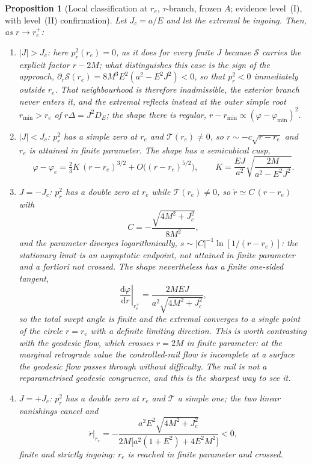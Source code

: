 \documentclass[12pt]{iopart}
\theoremstyle{plain}
\newtheorem{proposition}{Proposition}
\theoremstyle{definition}
\theoremstyle{remark}
\newcommand{\re}{r_{e}}
\newcommand{\Jc}{J_{c}}
\newcommand{\dd}{\mathrm{d}}
\begin{document}
\begin{proposition}[Local classification at $\re$, $\tau$-branch, frozen $A$;
evidence level~(I), with level~(II) confirmation]
\label{prop:classification}
Let $\Jc=a/E$ and let the extremal be ingoing. Then, as $r\to\re^+$:
\begin{enumerate}
\item[\rm(i)] $|J|>\Jc$: here $p_r^2(\re)=0$, as it does for every finite $J$
because $\mathcal S$ carries the explicit factor $r-2M$; what distinguishes this
case is the sign of the approach, $\partial_r\mathcal S(\re)=8M^3E^2(a^2-E^2J^2)<0$,
so that $p_r^2<0$ immediately outside $\re$. That neighbourhood is therefore
inadmissible, the exterior branch never enters it, and the extremal reflects
instead at the outer simple root $r_{\min}>\re$ of $r\Delta=J^2D_E$; the shape
there is regular, $r-r_{\min}\propto(\varphi-\varphi_{\min})^2$.
\item[\rm(ii)] $|J|<\Jc$: $p_r^2$ has a \emph{simple} zero at $\re$ and
$\mathcal T(\re)\neq0$, so $\dot r\sim-c\sqrt{r-\re}$ and $\re$ is attained in
\emph{finite} parameter. The shape has a semicubical cusp,
\begin{equation}
    \varphi-\varphi_e=\tfrac{2}{3}K\,(r-\re)^{3/2}+O\big((r-\re)^{5/2}\big),
    \qquad
    K=\frac{EJ}{a^2}\sqrt{\frac{2M}{a^2-E^2J^2}} .
    \label{eq:cusp}
\end{equation}
\item[\rm(iii)] $J=-\Jc$: $p_r^2$ has a \emph{double} zero at $\re$ while
$\mathcal T(\re)\neq0$, so $\dot r\simeq C\,(r-\re)$ with
\begin{equation}
    C=-\frac{\sqrt{4M^2+\Jc^2}}{8M^2},
    \label{eq:retro-rate}
\end{equation}
and the parameter diverges logarithmically, $s\sim|C|^{-1}\ln[1/(r-\re)]$: the
stationary limit is an \emph{asymptotic endpoint}, not attained in finite
parameter and \emph{a fortiori} not crossed. The shape nevertheless has a finite
one-sided tangent,
\begin{equation}
    \left.\frac{\dd\varphi}{\dd r}\right|_{\re^+}
      =\frac{2MEJ}{a^2\sqrt{4M^2+\Jc^2}},
    \label{eq:corner-slope}
\end{equation}
so the total swept angle is finite and the extremal converges to a single point
of the circle $r=\re$ with a definite limiting direction.
This is worth contrasting with the geodesic flow, which crosses $r=2M$ in finite
parameter: at the marginal retrograde value the \emph{controlled-rail} flow is
incomplete at a surface the geodesic flow passes through without difficulty. The
rail is not a reparametrised geodesic congruence, and this is the sharpest way to
see it.
\item[\rm(iv)] $J=+\Jc$: $p_r^2$ has a double zero at $\re$ \emph{and}
$\mathcal T$ a simple one; the two linear vanishings cancel and
\begin{equation}
    \dot r\big|_{\re}
      =-\frac{a^2E^2\sqrt{4M^2+\Jc^2}}{2M\big[a^2(1+E^2)+4E^2M^2\big]}<0 ,
    \label{eq:pro-rate}
\end{equation}
finite and strictly ingoing: $\re$ is reached in finite parameter and crossed.
\end{enumerate}
\end{proposition}
\end{document}
